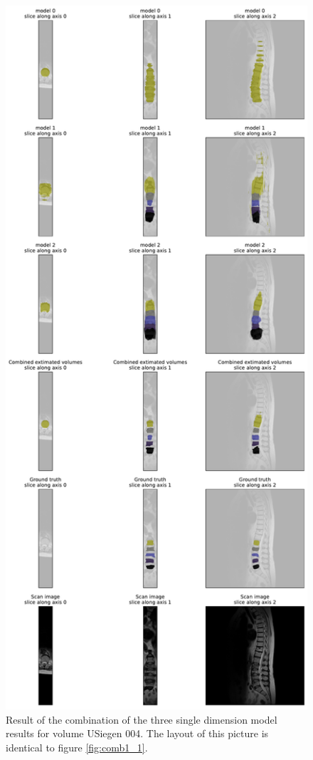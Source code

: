 \begin{figure}
    \centering
    \includegraphics[width=.95\textwidth]{images/comb1_denoise2_erode1_USiegen_004.pdf}
    \caption{
        Result of the combination of the three single dimension model results for volume USiegen 004. The layout of this picture is identical to figure \ref{fig:comb1_1}.
        \protect
        \label{fig:comb1_3}
    }
\end{figure}

